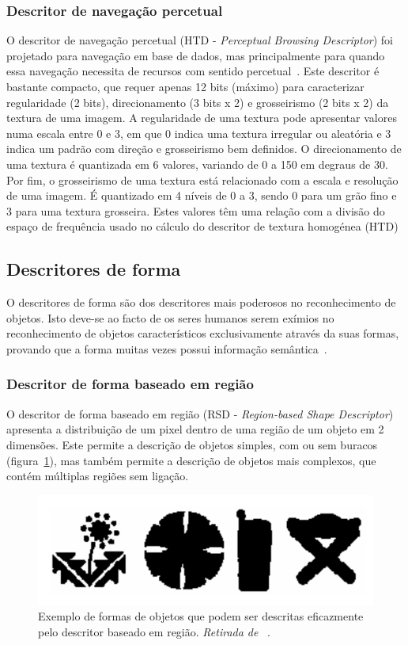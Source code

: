\subsubsection{Descritor de navegação percetual}

O descritor de navegação percetual (HTD - \textit{Perceptual Browsing Descriptor}) foi projetado para navegação em base de dados, mas principalmente para quando essa navegação necessita de recursos com sentido percetual~\cite{Wu2001}. Este descritor é bastante compacto, que requer apenas 12 bits (máximo) para caracterizar regularidade (2 bits), direcionamento (3 bits x 2) e grosseirismo (2 bits x 2) da textura de uma imagem. A regularidade de uma textura pode apresentar valores numa escala entre 0 e 3, em que 0 indica uma textura irregular ou aleatória e 3 indica um padrão com direção e grosseirismo bem definidos. O direcionamento de uma textura é quantizada em 6 valores, variando de 0 a 150 em degraus de 30. Por fim, o grosseirismo de uma textura está relacionado com a escala e resolução de uma imagem. É quantizado em 4 níveis de 0 a 3, sendo 0 para um grão fino e 3 para uma textura grosseira. Estes valores têm uma relação com a divisão do espaço de frequência usado no cálculo do descritor de textura homogénea (HTD)~\cite{Manjunath2001}

\subsection{Descritores de forma}

O descritores de forma são dos descritores mais poderosos no reconhecimento de objetos. Isto deve-se ao facto de os seres humanos serem exímios no reconhecimento de objetos característicos exclusivamente através da suas formas, provando que a forma muitas vezes possui informação semântica~\cite{Bober2001}.  

\subsubsection{Descritor de forma baseado em região}
O descritor de forma baseado em região (RSD - \textit{Region-based Shape Descriptor})~\cite{Bober2001} apresenta a distribuição de um pixel dentro de uma região de um objeto em 2 dimensões. Este permite a descrição de objetos simples, com ou sem buracos (figura~\ref{fig:shape1}), mas também permite a descrição de objetos mais complexos, que contém múltiplas regiões sem ligação.

\begin{figure}[h]
\centering
\includegraphics[width=0.7\linewidth]{./figures/shape1}
\caption{Exemplo de formas de objetos que podem ser descritas eficazmente pelo descritor baseado em região. \textit{Retirada de}~\cite{Bober2001} .}
\label{fig:shape1}
\end{figure}

